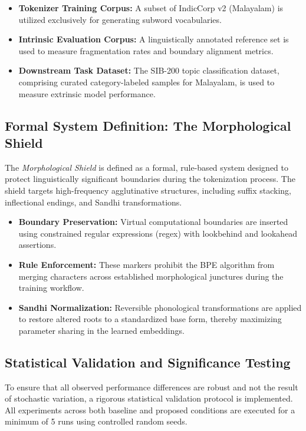 \documentclass[12pt]{article}
\begin{document}
\begin{itemize}
    \item \textbf{Tokenizer Training Corpus:} A subset of IndicCorp v2 (Malayalam) is utilized exclusively for generating subword vocabularies.
    \item \textbf{Intrinsic Evaluation Corpus:} A linguistically annotated reference set is used to measure fragmentation rates and boundary alignment metrics.
    \item \textbf{Downstream Task Dataset:} The SIB-200 topic classification dataset, comprising curated category-labeled samples for Malayalam, is used to measure extrinsic model performance.
\end{itemize}

\subsection{Formal System Definition: The Morphological Shield}

The \textit{Morphological Shield} is defined as a formal, rule-based system designed to protect linguistically significant boundaries during the tokenization process. The shield targets high-frequency agglutinative structures, including suffix stacking, inflectional endings, and Sandhi transformations.

\begin{itemize}
    \item \textbf{Boundary Preservation:} Virtual computational boundaries are inserted using constrained regular expressions (regex) with lookbehind and lookahead assertions.
    
    \item \textbf{Rule Enforcement:} These markers prohibit the BPE algorithm from merging characters across established morphological junctures during the training workflow.
    
    \item \textbf{Sandhi Normalization:} Reversible phonological transformations are applied to restore altered roots to a standardized base form, thereby maximizing parameter sharing in the learned embeddings.
\end{itemize}

\subsection{Statistical Validation and Significance Testing}

To ensure that all observed performance differences are robust and not the result of stochastic variation, a rigorous statistical validation protocol is implemented. All experiments across both baseline and proposed conditions are executed for a minimum of 5 runs using controlled random seeds.
\end{document}
